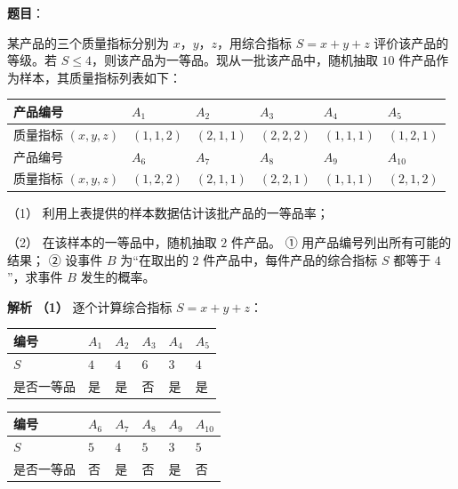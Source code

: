 \begin{answer}

\textbf{题目}：

某产品的三个质量指标分别为 $x$，$y$，$z$，用综合指标 $S=x+y+z$ 评价该产品的等级。若 $S\leqslant4$，则该产品为一等品。现从一批该产品中，随机抽取 $10$ 件产品作为样本，其质量指标列表如下：

\begin{center}
\begin{tabular}{llllll}
\toprule
产品编号 & $A_1$ & $A_2$ & $A_3$ & $A_4$ & $A_5$ \\
\midrule
质量指标 $(x,y,z)$ & $(1,1,2)$ & $(2,1,1)$ & $(2,2,2)$ & $(1,1,1)$ & $(1,2,1)$ \\
产品编号 & $A_6$ & $A_7$ & $A_8$ & $A_9$ & $A_{10}$ \\
质量指标 $(x,y,z)$ & $(1,2,2)$ & $(2,1,1)$ & $(2,2,1)$ & $(1,1,1)$ & $(2,1,2)$ \\
\bottomrule
\end{tabular}
\end{center}

（1） 利用上表提供的样本数据估计该批产品的一等品率；

（2） 在该样本的一等品中，随机抽取 $2$ 件产品。
① 用产品编号列出所有可能的结果；
② 设事件 $B$ 为“在取出的 $2$ 件产品中，每件产品的综合指标 $S$ 都等于 $4$”，求事件 $B$ 发生的概率。

\textbf{解析}
\textbf{（1）} 逐个计算综合指标 $S=x+y+z$：

\begin{center}
\begin{tabular}{llllll}
\toprule
编号 & $A_1$ & $A_2$ & $A_3$ & $A_4$ & $A_5$ \\
\midrule
$S$ & $4$ & $4$ & $6$ & $3$ & $4$ \\
是否一等品 & 是 & 是 & 否 & 是 & 是 \\
\bottomrule
\end{tabular}
\end{center}

\begin{center}
\begin{tabular}{llllll}
\toprule
编号 & $A_6$ & $A_7$ & $A_8$ & $A_9$ & $A_{10}$ \\
\midrule
$S$ & $5$ & $4$ & $5$ & $3$ & $5$ \\
是否一等品 & 否 & 是 & 否 & 是 & 否 \\
\bottomrule
\end{tabular}
\end{center}


\end{answer}
